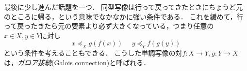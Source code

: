\documentclass[dvipdfmx,11pt,a4paper]{jsarticle}
\begin{document}
最後に少し進んだ話題を一つ．
同型写像は行って戻ってきたときにちょうど元のところに帰る，という意味でなかなかに強い条件である．
これを緩めて，行って戻ったきたら元の要素より必ず大きくなっている，つまり任意の$x \in X, y \in Y$に対し
\[
 x \preceq_X g(f(x)) \ \ \ \ \ \ y \preceq_Y f(g(y))
\]
という条件を考えることもできる．
こうした単調写像の対$f:X \to Y, g:Y \to X$は，\emph{ガロア接続}(Galois connection)と呼ばれる．



\end{document}
